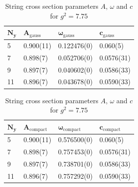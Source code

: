 \begin{table}[!hb]
\centering
\begin{tabular}{llll}
    $\mathbf{N_y}$ & $\mathbf{A_\mathrm{gauss}}$ & $\mathbf{\omega_\mathrm{gauss}}$ & $\mathbf{c_\mathrm{gauss}}$ \\ \hline
   5 & 0.900(11) & 0.122476(0) & 0.060(5) \\
   7 & 0.898(7) & 0.052706(0) & 0.0576(31) \\
   9 & 0.897(7) & 0.040602(0) & 0.0586(33) \\
   11 & 0.896(7) & 0.043678(0) & 0.0590(33) \\
\end{tabular}
\begin{tabular}{llll}
    $\mathbf{N_y}$ & $\mathbf{A_\mathrm{compact}}$ & $\mathbf{\omega_\mathrm{compact}}$ & $\mathbf{c_\mathrm{compact}}$ \\ \hline
   5 & 0.900(11) & 0.576500(0) & 0.060(5) \\
   7 & 0.898(7) & 0.757453(0) & 0.0576(31) \\
   9 & 0.897(7) & 0.738701(0) & 0.0586(33) \\
   11 & 0.896(7) & 0.757292(0) & 0.0590(33) \\
\end{tabular}
\caption{String cross section parameters $A$, $\omega$ and $c$ for $g^2=7.75$}
\end{table}
